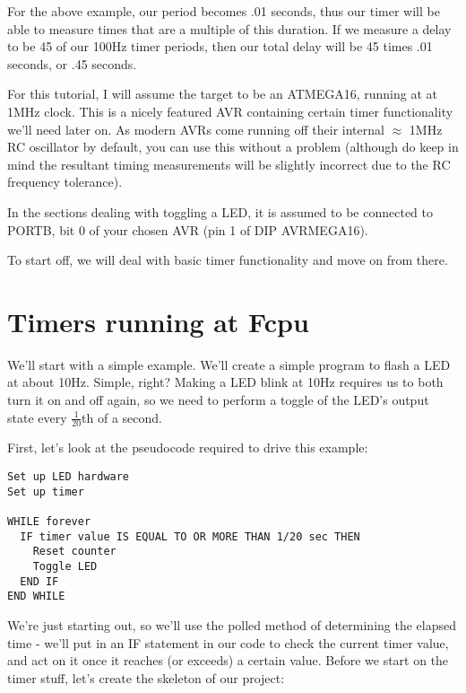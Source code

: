 \documentclass[a4paper,oneside,notitlepage]{book}
\begin{document}
For the above example, our period becomes .01 seconds, thus our timer will be able to measure times that are a multiple of this duration. If we measure a delay to be 45 of our 100Hz timer periods, then our total delay will be 45 times .01 seconds, or .45 seconds.

For this tutorial, I will assume the target to be an ATMEGA16, running at at 1MHz clock. This is a nicely featured AVR containing certain timer functionality we'll need later on. As modern AVRs come running off their internal \(\approx\) 1MHz RC oscillator by default, you can use this without a problem (although do keep in mind the resultant timing measurements will be slightly incorrect due to the RC frequency tolerance).

In the sections dealing with toggling a LED, it is assumed to be connected to PORTB, bit 0 of your chosen AVR (pin 1 of DIP AVRMEGA16).

To start off, we will deal with basic timer functionality and move on from there.

\label{chp:TimersFcpu}
\chapter{Timers running at Fcpu}

We'll start with a simple example. We'll create a simple program to flash a LED at about 10Hz. Simple, right? Making a LED blink at 10Hz requires us to both turn it on and off again, so we need to perform a toggle of the LED's output state every \(\frac{1}{20}\)th of a second.

First, let's look at the pseudocode required to drive this example:

\begin{center}
\begin{lstlisting}[keywordstyle=\color{black},commentstyle=\color{black}]
Set up LED hardware
Set up timer

WHILE forever
  IF timer value IS EQUAL TO OR MORE THAN 1/20 sec THEN
    Reset counter
    Toggle LED
  END IF
END WHILE
\end{lstlisting}
\end{center}

We're just starting out, so we'll use the polled method of determining the elapsed time - we'll put in an IF statement in our code to check the current timer value, and act on it once it reaches (or exceeds) a certain value. Before we start on the timer stuff, let's create the skeleton of our project:
\end{document}
